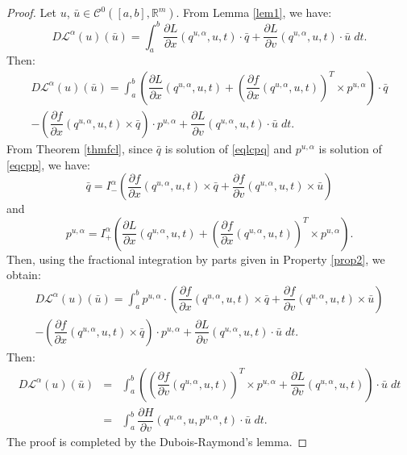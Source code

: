 \documentclass[english,11pt,reqno]{smfart}
\def\di{\displaystyle}
\newcommand{\R}{\mathbb{R}}
\newcommand{\LL}{\mathcal{L}}
\newcommand{\CC}{\mathscr{C}}
\begin{document}
\begin{proof}
Let $u$, $\bar{u} \in \CC^0 ([a,b],\R^m)$. From Lemma \ref{lem1}, we have:
\begin{equation}
D\LL^\alpha(u)(\bar{u}) = \di \int_{a}^{b} \dfrac{\partial L}{\partial x} (q^{u,\alpha},u,t) \cdot \bar{q} + \dfrac{\partial L}{\partial v} (q^{u,\alpha},u,t) \cdot \bar{u} \; dt.
\end{equation}
Then:
\begin{multline}
D\LL^\alpha(u)(\bar{u}) = \di \int_{a}^{b} \left( \dfrac{\partial L}{\partial x} (q^{u,\alpha},u,t) + \left( \dfrac{\partial f}{\partial x} (q^{u,\alpha},u,t) \right)^T \times p^{u,\alpha} \right) \cdot \bar{q} \\
- \left( \dfrac{\partial f}{\partial x} (q^{u,\alpha},u,t) \times \bar{q} \right) \cdot p^{u,\alpha} + \dfrac{\partial L}{\partial v} (q^{u,\alpha},u,t) \cdot \bar{u} \; dt.
\end{multline}
From Theorem \ref{thmfcl}, since $\bar{q}$ is solution of \eqref{eqlcpq} and $p^{u,\alpha}$ is solution of \eqref{eqcpp}, we have:
\begin{equation}
\bar{q} = I^\alpha_- \left( \dfrac{\partial f}{\partial x} (q^{u,\alpha},u,t) \times \bar{q} + \dfrac{\partial f}{\partial v} (q^{u,\alpha},u,t) \times \bar{u} \right) 
\end{equation}
and
\begin{equation}
p^{u,\alpha} = I^\alpha_+ \left( \dfrac{\partial L}{\partial x} (q^{u,\alpha},u,t) + \left( \dfrac{\partial f}{\partial x} (q^{u,\alpha},u,t) \right)^T \times p^{u,\alpha} \right).
\end{equation}
Then, using the fractional integration by parts given in Property \ref{prop2}, we obtain:
\begin{multline}
D\LL^\alpha(u)(\bar{u}) = \di \int_{a}^{b} p^{u,\alpha} \cdot \left( \dfrac{\partial f}{\partial x} (q^{u,\alpha},u,t) \times \bar{q} + \dfrac{\partial f}{\partial v} (q^{u,\alpha},u,t) \times \bar{u} \right) \\
- \left( \dfrac{\partial f}{\partial x} (q^{u,\alpha},u,t) \times \bar{q} \right) \cdot p^{u,\alpha} + \dfrac{\partial L}{\partial v} (q^{u,\alpha},u,t) \cdot \bar{u} \; dt.
\end{multline}
Then:
\begin{eqnarray*}
D\LL^\alpha(u)(\bar{u}) & = & \di \int_{a}^{b} \left( \left( \dfrac{\partial f}{\partial v} (q^{u,\alpha},u,t) \right)^T \times p^{u,\alpha} + \dfrac{\partial L}{\partial v} (q^{u,\alpha},u,t) \right) \cdot \bar{u} \; dt \\
& = & \di \int_{a}^{b} \dfrac{\partial H}{\partial v} (q^{u,\alpha},u,p^{u,\alpha},t)\cdot \bar{u} \; dt.
\end{eqnarray*}
The proof is completed by the Dubois-Raymond's lemma.
\end{proof}
\end{document}

